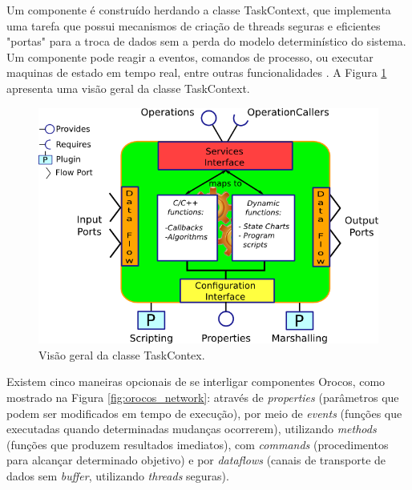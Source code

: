 \documentclass[conference]{IEEEtran}
\begin{document}
Um componente é construído herdando a classe TaskContext, que implementa uma tarefa que possui mecanismos de criação de threads seguras e eficientes "portas" para a troca de dados sem a perda do modelo determinístico do sistema. Um componente pode reagir a eventos, comandos de processo, ou executar maquinas de estado em tempo real, entre outras funcionalidades \cite{Orocos_manual}. A Figura \ref{fig:taskcontex} apresenta uma visão geral da classe TaskContext. 

\begin{figure}[h]
	\centering
	\includegraphics[scale=0.33]{files/ATaskContext.png}
	\caption{Visão geral da classe TaskContex.}
	\label{fig:taskcontex}
\end{figure}

Existem cinco maneiras opcionais de se interligar componentes Orocos, como mostrado na Figura \ref{fig:orocos_network}: através de \textit{properties} (parâmetros que podem ser modificados em tempo de execução), por meio de \textit{events} (funções que executadas quando determinadas mudanças ocorrerem), utilizando \textit{methods} (funções que produzem resultados imediatos), com \textit{commands} (procedimentos para alcançar determinado objetivo) e por \textit{dataflows} (canais de transporte de dados sem \textit{buffer}, utilizando \textit{threads} seguras).
\end{document}

